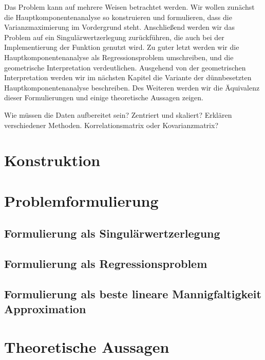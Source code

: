 Das Problem kann auf mehrere Weisen betrachtet werden. Wir wollen zunächst die Hauptkomponentenanalyse so konstruieren und formulieren, dass die Varianzmaximierung im Vordergrund steht. Anschließend werden wir das Problem auf ein Singulärwertzerlegung zurückführen, die auch bei der Implementierung der Funktion genutzt wird. Zu guter letzt werden wir die Hauptkomponentenanalyse als Regressionsproblem umschreiben, und die geometrische Interpretation verdeutlichen. Ausgehend von der geometrischen Interpretation werden wir im nächsten Kapitel die Variante der dünnbesetzten Hauptkomponentenanalyse beschreiben. Des Weiteren werden wir die Äquivalenz dieser Formulierungen und einige theoretische Aussagen zeigen.

Wie müssen die Daten aufbereitet sein? Zentriert und skaliert? Erklären verschiedener Methoden. Korrelationsmatrix oder Kovarianzmatrix?

\section{Konstruktion}

\section{Problemformulierung}
\subsection{Formulierung als Singulärwertzerlegung}
\subsection{Formulierung als Regressionsproblem}
\subsection{Formulierung als beste lineare Mannigfaltigkeit Approximation}

\section{Theoretische Aussagen}